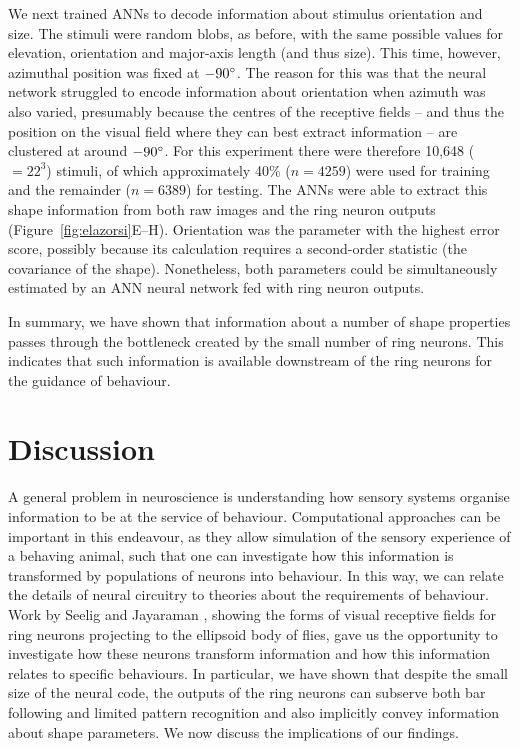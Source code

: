 We next trained ANNs to decode information about stimulus orientation and size.
The stimuli were random blobs, as before, with the same possible values for elevation, orientation and major-axis length (and thus size).
This time, however, azimuthal position was fixed at $-90\degree$.
The reason for this was that the neural network struggled to encode information about orientation when azimuth was also varied, presumably because the centres of the receptive fields -- and thus the position on the visual field where they can best extract information -- are clustered at around $-90\degree$.
For this experiment there were therefore 10,648 ($=22^3$) stimuli, of which approximately 40\% ($n=4259$) were used for training and the remainder ($n=6389$) for testing.
The ANNs were able to extract this shape information from both raw images and the ring neuron outputs (Figure~\ref{fig:elazorsi}E--H).
Orientation was the parameter with the highest error score, possibly because its calculation requires a second-order statistic (the covariance of the shape).
Nonetheless, both parameters could be simultaneously estimated by an ANN neural network fed with ring neuron outputs.

In summary, we have shown that information about a number of shape properties passes through the bottleneck created by the small number of ring neurons. This indicates that such information is available downstream of the ring neurons for the guidance of behaviour.

\section*{Discussion}
A general problem in neuroscience is understanding how sensory systems organise information to be at the service of behaviour. Computational approaches can be important in this endeavour, as they allow simulation of the sensory experience of a behaving animal, such that one can investigate how this information is transformed by populations of neurons into behaviour. In this way, we can relate the details of neural circuitry to theories about the requirements of behaviour. Work by Seelig and Jayaraman \cite{Seelig2013}, showing the forms of visual receptive fields for ring neurons projecting to the ellipsoid body of flies, gave us the opportunity to investigate how these neurons transform information and how this information relates to specific behaviours. In particular, we have shown that despite the small size of the neural code, the outputs of the ring neurons can subserve both bar following and limited pattern recognition and also implicitly convey information about shape parameters. We now discuss the implications of our findings.

